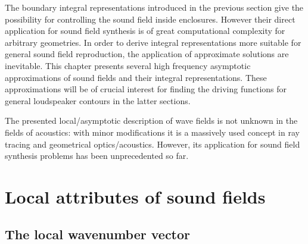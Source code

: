The boundary integral representations introduced in the previous section give the possibility for controlling the sound field inside enclosures. 
However their direct application for sound field synthesis is of great computational complexity for arbitrary geometries.
In order to derive integral representations more suitable for general sound field reproduction, the application of approximate solutions are inevitable.
This chapter presents several high frequency asymptotic approximations of sound fields and their integral representations.
These approximations will be of crucial interest for finding the driving functions for general loudspeaker contours in the latter sections.

The presented local/asymptotic description of wave fields is not unknown in the fields of acoustics: with minor modifications it is a massively used concept in ray tracing and geometrical optics/acoustics.
However, its application for sound field synthesis problems has been unprecedented so far.

\section{Local attributes of sound fields}
\subsection{The local wavenumber vector}

